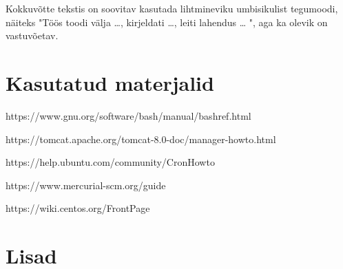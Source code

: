 \documentclass[12pt]{report}
\begin{document}
Kokkuvõtte tekstis on soovitav kasutada lihtmineviku umbisikulist tegumoodi, näiteks "Töös toodi välja …, kirjeldati …, leiti lahendus … ", aga ka olevik on vastuvõetav.

  \newpage
  
  \section*{Kasutatud materjalid}
  \label{kasutatud-materjalid}
  
  https://www.gnu.org/software/bash/manual/bashref.html
  
  https://tomcat.apache.org/tomcat-8.0-doc/manager-howto.html
  
  https://help.ubuntu.com/community/CronHowto
  
  https://www.mercurial-scm.org/guide
  
  https://wiki.centos.org/FrontPage

  \newpage
  
  \section*{Lisad}
  \label{lisad}
\end{document}

